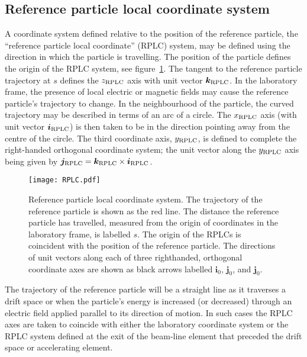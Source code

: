 \subsection{Reference particle local coordinate system}

A coordinate system defined relative to the position of the reference
particle, the ``reference particle local coordinate'' (RPLC) system,
may be defined using the direction in which the particle is
travelling. 
The position of the particle defines the origin of the RPLC system,
see figure~\ref{fig:RPLC}.
The tangent to the reference particle trajectory at $s$ defines the
$z_{\rm RPLC}$ axis with unit vector $\bm{k}_{\rm RPLC}$.
In the laboratory frame, the presence of local electric or magnetic
fields may cause the reference particle's trajectory to change.
In the neighbourhood of the particle, the curved trajectory may be
described in terms of an arc of a circle.
The $x_{\rm RPLC}$ axis (with unit vector $\bm{i}_{\rm RPLC}$) is then
taken to be in the direction pointing away from the centre of the
circle. 
The third coordinate axis, $y_{\rm RPLC}$, is defined to complete the
right-handed orthogonal coordinate system; the unit vector along the
$y_{\rm RPLC}$ axis being given by
$\bm{j}_{\rm RPLC} = \bm{k}_{\rm RPLC} \times \bm{i}_{\rm RPLC}$.
\begin{figure}
  \begin{center}
    \texttt{[image: RPLC.pdf]}
  \end{center}
  \caption{
    Reference particle local coordinate system.
    The trajectory of the reference particle is shown as the red line.
    The distance the reference particle has travelled, measured from
    the origin of coordinates in the laboratory frame, is labelled
    $s$.
    The origin of the RPLCs is coincident with the position of the
    reference particle.
    The directions of unit vectors along each of three righthanded,
    orthogonal coordinate axes are shown as black arrows labelled
    $\bm{i}_0$, $\bm{j}_0$, and $\bm{j}_0$. 
  }
  \label{fig:RPLC}
\end{figure}

The trajectory of the reference particle will be a straight line as it
traverses a drift space or when the particle's energy is increased (or
decreased) through an electric field applied parallel to its direction
of motion.
In such cases the RPLC axes are taken to coincide with either the
laboratory coordinate system or the RPLC system defined at the exit of
the beam-line element that preceded the drift space or accelerating
element.

